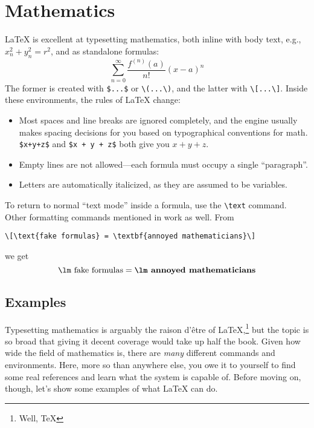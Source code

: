 \chapter{Mathematics}

\LaTeX{} is excellent at typesetting mathematics, both inline with body text,
e.g., $x_n^2+y_n^2=r^2$, and as standalone formulas:
\[\sum_{n=0}^{\infty} \frac{f^{(n)} (a)}{n!} (x - a)^n\]
The former is created with \verb|$...$| or \verb|\(...\)|,
and the latter with \verb|\[...\]|.
Inside these environments, the rules of \LaTeX{} change:
\begin{itemize}
\item Most spaces and line breaks are ignored completely,
    and the engine usually makes spacing decisions for you based on
    typographical conventions for math.
    \verb|$x+y+z$| and \verb|$x + y + z$| both give you $x+y+z$.
\item Empty lines are not allowed---each formula must occupy a single
    ``paragraph''\quotekern.
\item Letters are automatically italicized, as they are assumed to be variables.
\end{itemize}
To return to normal ``text mode'' inside a formula, use the \verb|\text| command.
Other formatting commands mentioned in  work as well.
From
\begin{leftfigure}
\begin{lstlisting}
\[\text{fake formulas} = \textbf{annoyed mathematicians}\]
\end{lstlisting}
\end{leftfigure}
we get
\[\text{\lm fake formulas} = \textbf{\lm annoyed mathematicians}\]

\section{Examples}

Typesetting mathematics is arguably the raison d'être of
\LaTeX,\punckern\footnote{Well, \TeX} but the topic is so broad that giving
it decent coverage would take up half the book.
Given how wide the field of mathematics is,
there are \emph{many} different commands and environments.
Here, more so than anywhere else,
you owe it to yourself to find some real references and learn what the system
is capable of.
Before moving on, though, let's show some examples of what \LaTeX{}
can do.
\newpage

